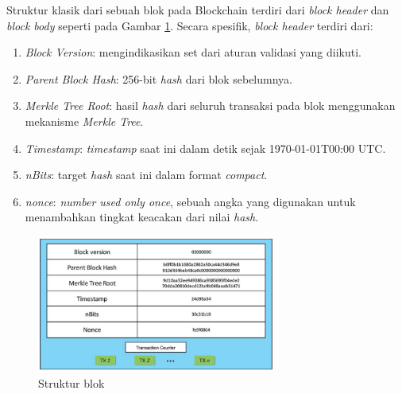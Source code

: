 Struktur klasik dari sebuah blok pada Blockchain terdiri dari \textit{block header} dan \textit{block body} seperti pada Gambar \ref{image:struktur-blok}. Secara spesifik, \textit{block header} terdiri dari:

\begin{enumerate}
	\item \textit{Block Version}: mengindikasikan set dari aturan validasi yang diikuti.
	\item \textit{Parent Block Hash}: 256-bit \textit{hash} dari blok sebelumnya.
	\item \textit{Merkle Tree Root}: hasil \textit{hash} dari seluruh transaksi pada blok menggunakan mekanisme \textit{Merkle Tree}.
	\item \textit{Timestamp}: \textit{timestamp} saat ini dalam detik sejak 1970-01-01T00:00 UTC.
	\item \textit{nBits}: target \textit{hash} saat ini dalam format \textit{compact}.
	\item \textit{nonce}: \textit{number used only once}, sebuah angka yang digunakan untuk menambahkan tingkat keacakan dari nilai \textit{hash}.
\end{enumerate}

\begin{figure}[ht]
	\centering
	\includegraphics[width=0.7\textwidth]{resources/chapter-2/struktur-block.png}
	\caption{Struktur blok \parencite{zheng2018blockchain}}
	\label{image:struktur-blok}
\end{figure}